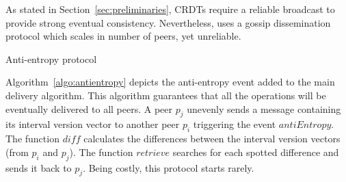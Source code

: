 As stated in Section~\ref{sec:preliminaries}, CRDTs require a reliable
broadcast to provide strong eventual consistency. Nevertheless, \CRATE
uses a gossip dissemination protocol which scales in number of peers, yet
unreliable.

\begin{algorithm}[h]
  
  \caption{\label{algo:antientropy}Anti-entropy protocol}
\end{algorithm}

Algorithm~\ref{algo:antientropy} depicts the anti-entropy event added to the
main delivery algorithm. This algorithm guarantees that all the operations will
be eventually delivered to all peers.  A peer $p_j$ unevenly sends a message
containing its interval version vector to another peer $p_i$ triggering the
event $antiEntropy$. The function $diff$ calculates the differences between the
interval version vectors (from $p_i$ and $p_j$). The function $retrieve$
searches for each spotted difference and sends it back to $p_j$. Being costly,
this protocol starts rarely.
